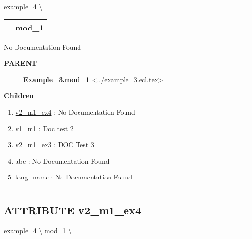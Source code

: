 \hypertarget{ecldoc:intest.example_4.mod_1}{}
\hspace{0pt} \hyperlink{ecldoc:intest.example_4}{example_4} \textbackslash 

{\renewcommand{\arraystretch}{1.5}
\begin{tabularx}{\textwidth}{|>{\raggedright\arraybackslash}l|X|}
\hline
\hspace{0pt}\mytexttt{\color{red} } & \textbf{mod\_1} \\
\hline
\end{tabularx}
}

\par





No Documentation Found










\par
\begin{description}
\item [\colorbox{tagtype}{\color{white} \textbf{\textsf{PARENT}}}] \textbf{Example\_3.mod\_1} <../example\_3.ecl.tex>
\end{description}


\textbf{Children}
\begin{enumerate}
\item \hyperlink{ecldoc:intest.example_4.mod_1.v2_m1_ex4}{v2\_m1\_ex4}
: No Documentation Found
\item \hyperlink{ecldoc:example_3.mod_1.v1_m1}{v1\_m1}
: Doc test 2
\item \hyperlink{ecldoc:example_3.mod_1.v2_m1_ex3}{v2\_m1\_ex3}
: DOC Test 3
\item \hyperlink{ecldoc:example_3.mod_1.abc}{abc}
: No Documentation Found
\item \hyperlink{ecldoc:example_3.mod_1.long_name}{long\_name}
: No Documentation Found
\end{enumerate}

\rule{\linewidth}{0.5pt}

\subsection*{\textsf{\colorbox{headtoc}{\color{white} ATTRIBUTE}
v2\_m1\_ex4}}

\hypertarget{ecldoc:intest.example_4.mod_1.v2_m1_ex4}{}
\hspace{0pt} \hyperlink{ecldoc:intest.example_4}{example_4} \textbackslash 
\hspace{0pt} \hyperlink{ecldoc:intest.example_4.mod_1}{mod_1} \textbackslash 

